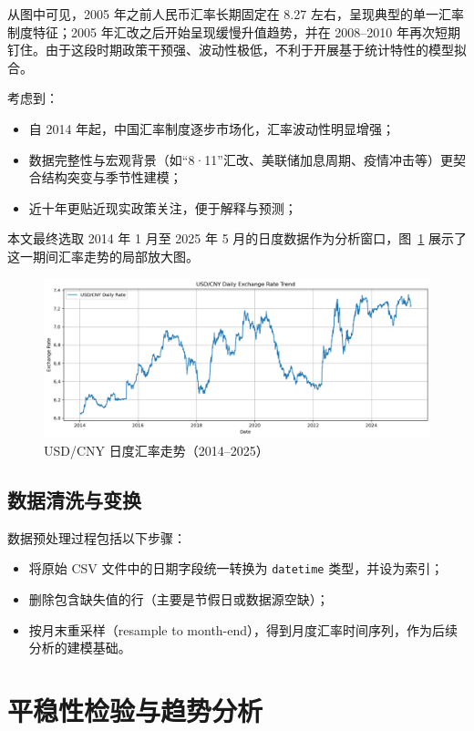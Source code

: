\documentclass[11pt,a4paper]{article}
\begin{document}
从图中可见，2005 年之前人民币汇率长期固定在 8.27 左右，呈现典型的单一汇率制度特征；2005 年汇改之后开始呈现缓慢升值趋势，并在 2008--2010 年再次短期钉住。由于这段时期政策干预强、波动性极低，不利于开展基于统计特性的模型拟合。

考虑到：
\begin{itemize}
  \item 自 2014 年起，中国汇率制度逐步市场化，汇率波动性明显增强；
  \item 数据完整性与宏观背景（如“8·11”汇改、美联储加息周期、疫情冲击等）更契合结构突变与季节性建模；
  \item 近十年更贴近现实政策关注，便于解释与预测；
\end{itemize}
本文最终选取 2014 年 1 月至 2025 年 5 月的日度数据作为分析窗口，图~\ref{fig:rate-zoom} 展示了这一期间汇率走势的局部放大图。

\begin{figure}[H]
  \centering
  \includegraphics[width=1\textwidth]{./figures/2014-2025.png}
  \caption{USD/CNY 日度汇率走势（2014--2025）}
  \label{fig:rate-zoom}
\end{figure}

\subsection{数据清洗与变换}

数据预处理过程包括以下步骤：
\begin{itemize}
  \item 将原始 CSV 文件中的日期字段统一转换为 \texttt{datetime} 类型，并设为索引；
  \item 删除包含缺失值的行（主要是节假日或数据源空缺）；
  \item 按月末重采样（resample to month-end），得到月度汇率时间序列，作为后续分析的建模基础。
\end{itemize}


\section{平稳性检验与趋势分析}
\end{document}
